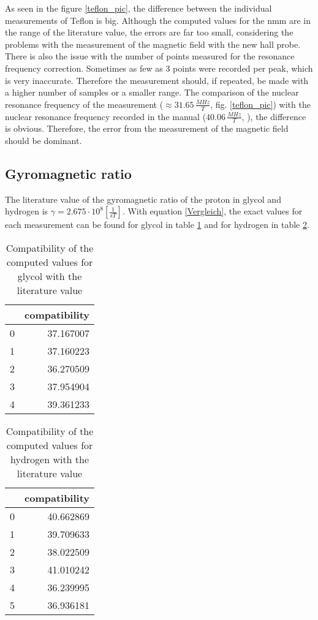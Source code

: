 As seen in the figure \ref{teflon_pic}, the difference between the individual measurements of Teflon is big. Although the computed values for the nmm are in the range of the literature value, the errors are far too small, considering the problems with the measurement of the magnetic field with the new hall probe. There is also the issue with the number of points measured for the resonance frequency correction. Sometimes as few as 3 points were recorded per peak, which is very inaccurate. Therefore the measurement should, if repeated, be made with a higher number of samples or a smaller range. The comparison of the nuclear resonance frequency of the measurement ($\approx 31.65\,\frac{MHz}{T}$, fig. \ref{teflon_pic}) with the nuclear resonance frequency recorded in the manual ($40.06\,\frac{MHz}{T}$, \cite{anleitung}), the difference is obvious. Therefore, the error from the measurement of the magnetic field should be dominant.

\FloatBarrier
\subsection{Gyromagnetic ratio}
The literature value of the gyromagnetic ratio of the proton in glycol and hydrogen is $\gamma =  2.675\cdot 10^8 \left[\frac{1}{s T}\right]$. With equation \ref{Vergleich}, the exact values for each measurement can be found for glycol in table \ref{vgl_g} and for hydrogen in table \ref{vlg_h}.

\begin{table}
	\caption{Compatibility of the computed values for glycol with the literature value}
	\label{vgl_g}
	\centering

\begin{tabular}{lr}
	\toprule
	{} &  compatibility \\
	\midrule
	0 &      37.167007 \\
	1 &      37.160223 \\
	2 &      36.270509 \\
	3 &      37.954904 \\
	4 &      39.361233 \\
	\bottomrule
\end{tabular}
\end{table}

\begin{table}
	
	\caption{Compatibility of the computed values for hydrogen with the literature value}
	\label{vlg_h}
	\centering
	\begin{tabular}{lr}
	\toprule
	{} &  compatibility \\
	\midrule
	0 &      40.662869 \\
	1 &      39.709633 \\
	2 &      38.022509 \\
	3 &      41.010242 \\
	4 &      36.239995 \\
	5 &      36.936181 \\
	\bottomrule
\end{tabular}


\end{table}

